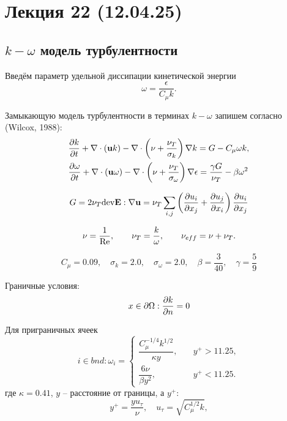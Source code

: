 \section{Лекция 22 (12.04.25)}

\subsection{$k-\omega$ модель турбулентности}

Введём параметр удельной диссипации кинетической энергии
\begin{equation}
\label{eq:turb_omega}
\omega = \frac{\epsilon}{C_\mu k}.
\end{equation}

Замыкающую модель турбулентности в терминах $k-\omega$ запишем согласно (Wilcox, 1988):
\begin{align}
\label{eq:komega}
&\frac{\partial k}{\partial t} + \nabla\cdot(\boldsymbol{\rm u} k) - \nabla \cdot \left(\nu + \frac{\nu_T}{\sigma_k}\right)\nabla k = G - C_\mu \omega k, \\
&\frac{\partial \omega}{\partial t} + \nabla\cdot(\boldsymbol{\rm u} \omega) - \nabla \cdot \left(\nu + \frac{\nu_T}{\sigma_\omega}\right)\nabla \epsilon = 
	\frac{\gamma G}{\nu_T} - \beta \omega^2
\end{align}

\begin{equation}
G = 2 \nu_T {\rm dev} \boldsymbol{\rm E} : \nabla\boldsymbol{\rm u} = \nu_T \sum_{i,j}\left(\frac{\partial u_i}{\partial x_j} + \frac{\partial u_j}{\partial x_i}\right)\frac{\partial u_i}{\partial x_j}
\end{equation}

\begin{equation}
\nu = \frac{1}{\mathrm{Re}}, \qquad \nu_T = \frac{k}{\omega}, \qquad \nu_{eff} = \nu + \nu_T.
\end{equation}

\begin{equation*}
C_\mu = 0.09, \quad \sigma_k = 2.0, \quad \sigma_\omega = 2.0, \quad \beta = \frac{3}{40}, \quad  \gamma = \frac59
\end{equation*}

Граничные условия:
\begin{equation}
x\in\partial\Omega: \frac{\partial k}{\partial n} = 0
\end{equation}

Для приграничных ячеек
\begin{equation}
i \in bnd: \omega_i = \begin{cases}
\dfrac{C_\mu^{-1/4} k^{1/2}}{\kappa y}, &\quad y^+ > 11.25, \\[10pt]
\dfrac{6 \nu}{\beta y^2},               &\quad y^+ < 11.25.
\end{cases}
\end{equation}
где $\kappa=0.41$, $y$ -- расстояние от границы, а $y^+$:
\begin{equation*}
y^+ = \frac{y u_\tau}{\nu}, \quad u_\tau = \sqrt{C_\mu^{1/2}k},
\end{equation*}

